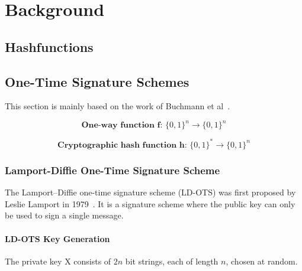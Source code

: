 \chapter{Background}
\label{cha:background}


\section{Hashfunctions}

\section{One-Time Signature Schemes}
This section is mainly based on the work of Buchmann et al~\cite{book_pqc_bernstein_2004}.



\begin{equation}
\label{eq:one-way-func}
\textbf{One-way function f: } \lbrace 0,1 \rbrace^n \rightarrow \lbrace 0,1 \rbrace ^n
\end{equation}

\begin{equation}
\label{eq:basic_hashfunc}
\textbf{Cryptographic hash function h: } \lbrace 0,1 \rbrace^* \rightarrow \lbrace 0,1 \rbrace^n
\end{equation}

\subsection{Lamport-Diffie One-Time Signature Scheme}
The Lamport–Diffie one-time signature scheme (LD-OTS) was first proposed by Leslie Lamport in 1979~\cite{lamport_signature_scheme_1979}. 
It is a signature scheme where the public key can only be used to sign a single message.


\subsubsection{LD-OTS Key Generation}
The private key X consists of $2n$ bit strings, each of length $n$, chosen at random. %

